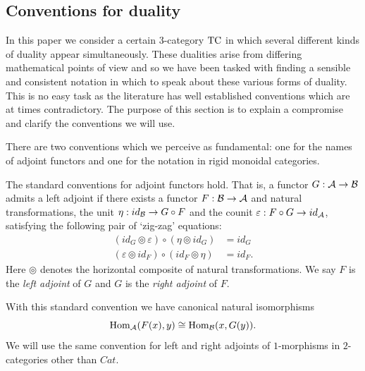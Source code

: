 \documentclass{amsart}
\begin{document}
\subsection{Conventions for duality} \label{sec:conventions}

In this paper we consider a certain 3-category $\mathrm{TC}$ in which several different kinds of duality appear simultaneously. These dualities arise from differing mathematical points of view and so we have been tasked with finding a sensible and consistent notation in which to speak about these various forms of duality. This is no easy task as the literature has well established conventions which are at times contradictory.  The purpose of this section is to explain a compromise and clarify the conventions we will use.

There are two conventions which we perceive as fundamental: one for the names of adjoint functors and one for the notation in rigid monoidal categories. 

\begin{definition} \label{def:Adjoints}
	The standard conventions for adjoint functors hold. That is, a functor $G: \mathcal A \to \mathcal B$  admits a left adjoint if there exists a functor $F: \mathcal B \to \mathcal A$ and natural transformations, the  unit $\eta: id_{\mathcal B} \to G \circ F$ and the  counit $\varepsilon: F \circ G \to id_{\mathcal A}$, satisfying the following pair of `zig-zag' equations:
	\begin{align*}
		(id_{G} \circledcirc \varepsilon  ) \circ (  \eta \circledcirc id_{G}) &= id_{G} \\
		(\varepsilon \circledcirc id_{F}) \circ (id_{F} \circledcirc \eta) &= id_{F}.
	\end{align*}
Here $\circledcirc$ denotes the horizontal composite of natural transformations.
We say $F$ is the {\em left adjoint} of $G$ and $G$ is the {\em right adjoint} of $F$.
\end{definition}

\nid With this standard convention we have canonical natural isomorphisms
\begin{equation*}
	\operatorname{Hom}_\mathcal A(F(x), y) \cong \operatorname{Hom}_\mathcal B(x, G(y)).
\end{equation*}
We will use the same convention for left and right adjoints of $1$-morphisms in $2$-categories other than $Cat$.
\end{document}
